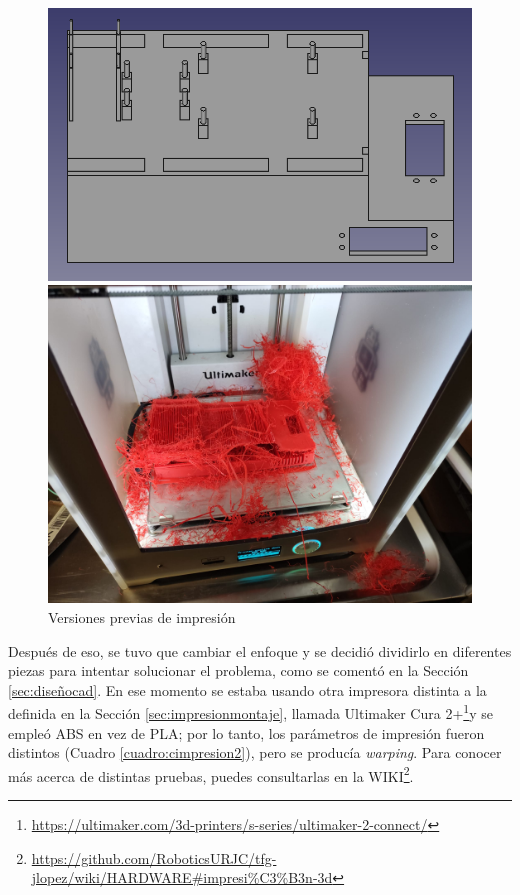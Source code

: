 \begin{figure}[ht!]
	\centering
	\begin{minipage}{0.45\linewidth}
		\centering
		\includegraphics[width=\linewidth]{figs/cap7/impresionfallida1.png}
	\end{minipage}
	\hspace{1cm}
	\begin{minipage}{0.40\linewidth}
		\centering
		\includegraphics[width=\linewidth]{figs/cap7/piezav1error.jpeg}
	\end{minipage}
	\caption{Versiones previas de impresión}
	\label{fig:imfallida}
\end{figure}


Después de eso, se tuvo que cambiar el enfoque y se decidió dividirlo en diferentes piezas para intentar solucionar el problema, como se comentó en la Sección \ref{sec:diseñocad}. En ese momento se estaba usando otra impresora distinta a la definida en la Sección \ref{sec:impresionmontaje}, llamada Ultimaker Cura 2+\footnote{\url{https://ultimaker.com/3d-printers/s-series/ultimaker-2-connect/}}y se empleó ABS en vez de PLA; por lo tanto, los parámetros de impresión fueron distintos (Cuadro \ref{cuadro:cimpresion2}), pero se producía \textit{warping}. Para conocer más acerca de distintas pruebas, puedes consultarlas en la WIKI\footnote{\url{https://github.com/RoboticsURJC/tfg-jlopez/wiki/HARDWARE\#impresi\%C3\%B3n-3d}}.

